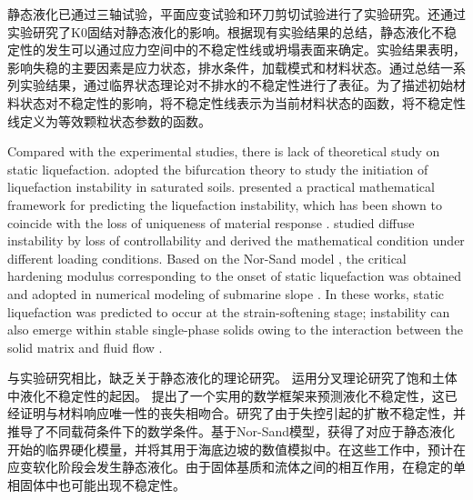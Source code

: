 \begin{ParaColumn}
    \switchcolumn

    静态液化已通过三轴试验\citep{Sladen1985, Lade1990,Yamamuro1997,Doanh1997}，平面应变试验\citep{Chu2008}和环刀剪切试验\citep{Liu2011}进行了实验研究。还通过实验研究了K0固结对静态液化的影响\citep{Fourie2005, Chu2008}。根据现有实验结果的总结，静态液化不稳定性的发生可以通过应力空间中的不稳定性线\citep{Lade1990}或坍塌表面\citep{Sladen1985}来确定。实验结果\citep{Daouadji2010,Wanatowski2012}表明，影响失稳的主要因素是应力状态，排水条件，加载模式和材料状态。通过总结一系列实验结果，通过临界状态理论对不排水的不稳定性进行了表征\citep{Rahman2011,Bedin2012}。为了描述初始材料状态对不稳定性的影响，\citet{Yang2002}将不稳定性线表示为当前材料状态的函数，\citet{Rahman2011}将不稳定性线定义为等效颗粒状态参数的函数。

    \switchcolumn*

    Compared with the experimental studies, there is lack of theoretical study on static liquefaction. \citet{Borja2006} adopted the bifurcation theory to study the initiation of liquefaction instability in saturated soils. \citet{Andrade2009} presented a practical mathematical framework for predicting the liquefaction instability, which has been shown to coincide with the loss of uniqueness of material response \citep{Nova1994}. \citet{Buscarnera2011} studied diffuse instability by loss of controllability and derived the mathematical condition under different loading conditions. Based on the Nor-Sand model \citep{Jefferies1993, Andrade2008}, the critical hardening modulus corresponding to the onset of static liquefaction was obtained and adopted in numerical modeling of submarine slope \citep{Ellison2009}. In these works, static liquefaction was predicted to occur at the strain-softening stage; instability can also emerge within stable single-phase solids owing to the interaction between the solid matrix and fluid flow \citep{Bardet2002}.

    \switchcolumn

    与实验研究相比，缺乏关于静态液化的理论研究。 \citet{Borja2006}运用分叉理论研究了饱和土体中液化不稳定性的起因。 \citet{Andrade2009}提出了一个实用的数学框架来预测液化不稳定性，这已经证明与材料响应唯一性的丧失相吻合\citep{Nova1994}。\citet{Buscarnera2011}研究了由于失控引起的扩散不稳定性，并推导了不同载荷条件下的数学条件。基于Nor-Sand模型\citep{Jefferies1993, Andrade2008}，获得了对应于静态液化开始的临界硬化模量，并将其用于海底边坡的数值模拟中\citep{Ellison2009}。在这些工作中，预计在应变软化阶段会发生静态液化。由于固体基质和流体之间的相互作用，在稳定的单相固体中也可能出现不稳定性\citep{Bardet2002}。


\end{ParaColumn}
